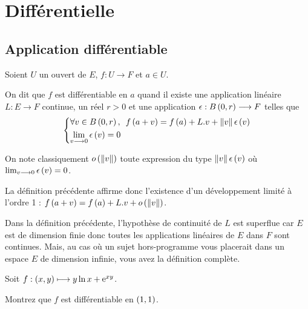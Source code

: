 \section{Différentielle}

\subsection{Application différentiable}

\begin{defi}
Soient \(U\) un ouvert de \(E\), \(f:U\to F\) et \(a\in U\).

On dit que \(f\) est différentiable en \(a\) quand il existe une application linéaire \(L:E\to F\) continue, un réel \(r>0\) et une application \(\epsilon:\bouleo{0}{r}\to F\) telles que \[\begin{dcases}
\quantifs{\forall v\in\bouleo{0}{r}}f\paren{a+v}=f\paren{a}+L.v+\norme{v}\epsilon\paren{v} \\
\lim_{v\to0}\epsilon\paren{v}=0
\end{dcases}\]
\end{defi}

On note classiquement \(\o{\norme{v}}\) toute expression du type \(\norme{v}\epsilon\paren{v}\) où \(\lim_{v\longrightarrow0}\epsilon\left(v\right)=0\).

La définition précédente affirme donc l'existence d'un développement limité à l'ordre 1 : \(f\paren{a+v}=f\paren{a}+L.v+\o{\norme{v}}\).

\begin{rem}
Dans la définition précédente, l'hypothèse de continuité de \(L\) est superflue car \(E\) est de dimension finie donc toutes les applications linéaires de \(E\) dans \(F\) sont continues. Mais, au cas où un sujet hors-programme vous placerait dans un espace \(E\) de dimension infinie, vous avez la définition complète.
\end{rem}

\begin{exo}
Soit \(f:\left(x,y\right)\longmapsto y\ln x+\mathrm{e}^{xy}\).

Montrez que \(f\) est différentiable en \(\left(1,1\right)\).
\end{exo}

